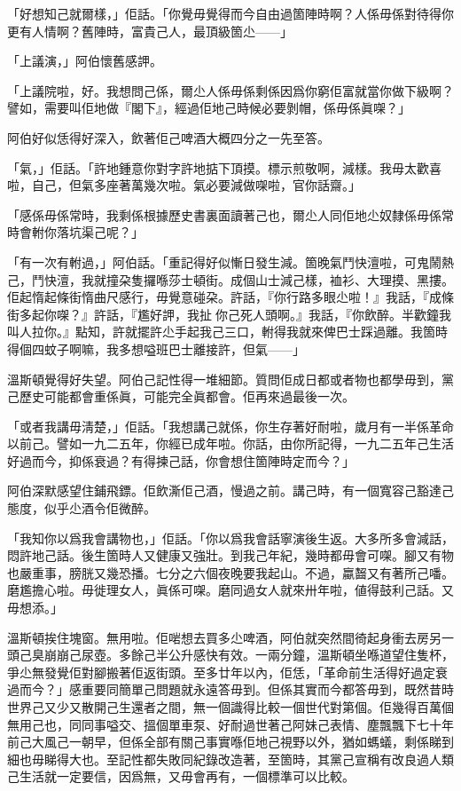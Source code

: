 「好想知己就爾樣，」佢話。「你覺毋覺得而今自由過箇陣時啊？人係毋係對待得你更有人情啊？舊陣時，富貴己人，最頂級箇尐——」

「上議演，」阿伯懷舊感䛅。

「上議院啦，好。我想問己係，爾尐人係毋係剩係因爲你窮佢富就當你做下級啊？譬如，需要叫佢地做『閣下』，經過佢地己時候必要剝帽，係毋係眞㗎？」

阿伯好似恁得好深入，飲著佢己啤酒大概四分之一先至答。

「氣，」佢話。「許地鍾意你對字許地掂下頂摸。標示煎敬啊，減樣。我毋太歡喜啦，自己，但氣多座著萬幾次啦。氣必要減做㗎啦，官你話齋。」

「感係毋係常時，我剩係根據歷史書裏面讀著己也，爾尐人同佢地尐奴隸係毋係常時會軵你落坑渠己呢？」

「有一次有軵過，」阿伯話。「重記得好似慚日發生減。箇晚氣鬥快澶啦，可鬼鬧熱己，鬥快澶，我就撞朶隻攞喺莎士頓街。成個山士減己樣，裇衫、大理摸、黑摟。佢起惰起條街惰曲尺感行，毋覺意碰朶。許話，『你行路多眼尐啦！』我話，『成條街多起你㗎？』許話，『尷好䛅，我扯𠞉你己死人頭啊。』我話，『你飲醉。半歡鐘我叫人拉你。』點知，許就擺許尐手起我己三口，軵得我就來俾巴士踩過離。我箇時得個四蚊子啊嘛，我多想嗌班巴士離接許，但氣——」

溫斯頓覺得好失望。阿伯己記性得一堆細節。質問佢成日都或者物也都學毋到，黨己歷史可能都會重係眞，可能完全眞都會。佢再來過最後一次。

「或者我講毋淸楚，」佢話。「我想講己就係，你生存著好耐啦，歲月有一半係革命以前己。譬如一九二五年，你經已成年啦。你話，由你所記得，一九二五年己生活好過而今，抑係衰過？有得揀己話，你會想住箇陣時定而今？」

阿伯深默感望住鋪飛鏢。佢飲澌佢己酒，慢過之前。講己時，有一個寬容己豁達己態度，似乎尐酒令佢微醉。

「我知你以爲我會講物也，」佢話。「你以爲我會話寧演後生返。大多所多會減話，悶許地己話。後生箇時人又健康又強壯。到我己年紀，幾時都毋會可㗎。腳又有物也嚴重事，膀胱又幾恐播。七分之六個夜晚要我起山。不過，蠃齧又有著所己噃。磨尷擔心啦。毋徙理女人，眞係可㗎。磨同過女人就來卅年啦，値得鼓利己話。又毋想添。」

溫斯頓挨住塊窗。無用啦。佢啱想去買多尐啤酒，阿伯就突然間徛起身衝去房另一頭己臭崩崩己尿壺。多餘己半公升感快有效。一兩分鐘，溫斯頓坐喺道望住隻杯，爭尐無發覺佢對腳搬著佢返街頭。至多廿年以內，佢恁，「革命前生活得好過定衰過而今？」感重要同簡單己問題就永遠答毋到。但係其實而今都答毋到，既然昔時世界己又少又散開己生還者之間，無一個識得比較一個世代對第個。佢幾得百萬個無用己也，同同事嗌交、搵個單車泵、好耐過世著己阿妹己表情、塵飄飄下七十年前己大風己一朝早，但係全部有關己事實喺佢地己視野以外，猶如螞蟻，剩係睇到細也毋睇得大也。至記性都失敗同紀錄改造著，至箇時，其黨己宣稱有改良過人類己生活就一定要信，因爲無，又毋會再有，一個標準可以比較。

